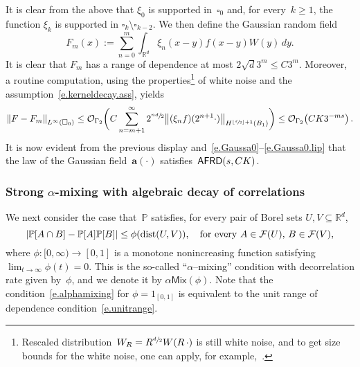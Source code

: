 \documentclass[11pt]{article} %
\let\oldsquare\square %
\renewcommand{\square}{\oldsquare}
\numberwithin{equation}{section}
\theoremstyle{definition}
\let\originalleft\left
\let\originalright\right
\renewcommand{\left}{\mathopen{}\mathclose\bgroup\originalleft}
\renewcommand{\right}{\aftergroup\egroup\originalright}
\newcommand*{\Rd}{\ensuremath{\mathbb{R}^d}}
\renewcommand{\a}{\mathbf{a}}
\newcommand{\cu}{\square}
\newcommand{\F}{\mathcal{F}}
\renewcommand{\P}{\mathbb{P}}
\renewcommand{\O}{\mathcal{O}}
\newcommand{\indc}{1}
\DeclareMathOperator{\dist}{dist}
\newcommand{\AFRD}{\mathsf{AFRD}}
\begin{document}
It is clear from the above that $\xi_0$ is supported in~$\cu_0$ and, for every~$k\geq1$, the function $\xi_{k}$ is supported in $\cu_k\setminus\cu_{k-2}$. We then define the Gaussian random field 
\begin{equation*}
F_m(x):= \sum_{n=0}^m 
\int_{\Rd} \xi_n(x-y) f(x-y) W(y)\,dy.
\end{equation*}
It is clear that $F_m$ has a range of dependence at most $2\sqrt{d} 3^m \leq C3^m$. Moreover, a routine computation, using the properties\footnote{Rescaled distribution~$W_R = R^{\sfrac d2} W(R \, \cdot )$ is still white noise, and to get size bounds for the white noise,  one can apply, for example,~\cite[Proposition 5.14]{AKMBook}.}  of white noise and the assumption~\eqref{e.kerneldecay.ass}, yields  
\begin{equation*}
\left\| F - F_m \right\|_{L^\infty(\cu_0)} 
\leq 
\O_{\Gamma_2}\biggl(
C \sum_{n=m+1}^\infty 2^{ \sfrac{ n d}2  } \big\| (\xi_n f)(2^{n+1} \cdot ) \big\|_{H^{\left\lfloor \sfrac d2 \right\rfloor +1}(B_{1})} 
\biggr)
\leq 
\O_{\Gamma_2}\bigl( CK 3^{-m s}\bigr)
\,.
\end{equation*}
It is now evident from the previous display and~\eqref{e.Gaussa0}--\eqref{e.Gaussa0.lip} that the law of the Gaussian field~$\a(\cdot)$ satisfies~$\AFRD\left(s,CK\right)$. 





\subsubsection{Strong $\alpha$-mixing with algebraic decay of correlations}
We next consider the case that~$\P$ satisfies, for every pair of Borel sets $U,V\subseteq\Rd$, 
\begin{equation}
\label{e.alphamixing}
\left| \P\left[ A\cap B\right] - \P\left[ A \right]\P\left[ B \right] \right|
\leq
\phi\left( \dist(U,V) \right),
\quad 
\mbox{for every}\ A\in \F(U),\, B\in \F(V),
\end{equation}
where $\phi:[0,\infty) \to [0,1]$ is a monotone nonincreasing function satisfying $\lim_{t\to \infty} \phi(t) = 0$. This is the so-called ``$\alpha$--mixing'' condition with decorrelation rate given by~$\phi$, and we denote it by $\alpha\mathsf{Mix}(\phi)$. Note that the condition~\eqref{e.alphamixing} for $\phi = \indc_{[0,1]}$ is equivalent to the unit range of dependence condition~\eqref{e.unitrange}. 

\smallskip
\end{document}

